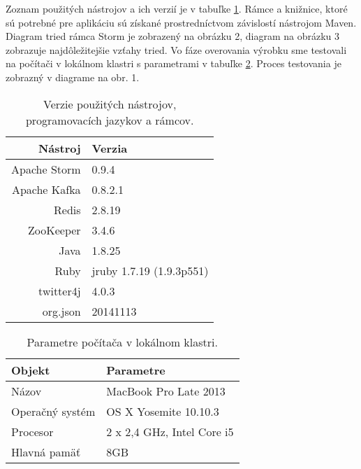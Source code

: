 Zoznam použitých nástrojov a ich verzií je v tabuľke \ref{tab-verziel}. Rámce a knižnice, ktoré sú potrebné pre aplikáciu sú získané prostredníctvom závislostí nástrojom Maven.
Diagram tried rámca Storm je zobrazený na obrázku 2, diagram na obrázku 3 zobrazuje najdôležitejšie vzťahy tried. Vo fáze overovania výrobku sme testovali na počítači v lokálnom klastri s parametrami v tabuľke \ref{tab-param}. Proces testovania je zobrazný v diagrame na obr. 1.
\renewcommand\tablename{Tabuľka}
\begin{table}[!htp]
\centering
\begin{tabular}{|r|l|}
\hline
\textbf{Nástroj} & \textbf{Verzia} \\ \hline
Apache Storm & 0.9.4 \\ \hline
Apache Kafka & 0.8.2.1 \\ \hline
Redis & 2.8.19 \\ \hline
ZooKeeper & 3.4.6 \\ \hline
Java & 1.8.25 \\ \hline
Ruby & jruby 1.7.19 (1.9.3p551) \\ \hline
twitter4j & 4.0.3 \\ \hline
org.json & 20141113 \\ \hline
\end{tabular}
\caption{Verzie použitých nástrojov, programovacích jazykov a rámcov.}
\label{tab-verziel}
\end{table}

\begin{table}[h!tbp]
\centering
\begin{tabular}{|l|l|}
\hline
\textbf{Objekt} & \textbf{Parametre} \\ \hline
Názov & MacBook Pro Late 2013 \\ \hline
Operačný systém & OS X Yosemite 10.10.3 \\ \hline
Procesor & 2 x 2,4 GHz, Intel Core i5 \\ \hline
Hlavná pamäť & 8GB \\ \hline
\end{tabular}
\caption{Parametre počítača v lokálnom klastri.}
\label{tab-param}
\end{table}

\label{fig:tech-test-proc}
\label{fig:tech-storm-class}
\label{fig:tech-moj-class}



